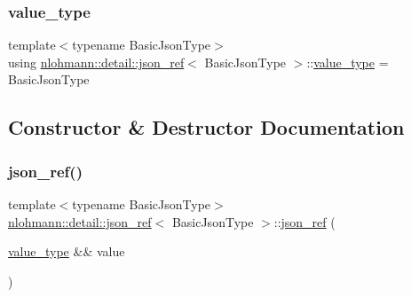 \subsubsection{\texorpdfstring{value\_type}{value\_type}}
{\footnotesize\ttfamily template$<$typename Basic\+Json\+Type$>$ \\
using \mbox{\hyperlink{classnlohmann_1_1detail_1_1json__ref}{nlohmann\+::detail\+::json\+\_\+ref}}$<$ Basic\+Json\+Type $>$\+::\mbox{\hyperlink{classnlohmann_1_1detail_1_1json__ref_a78d76cf288141049568c0d670ed670ef}{value\+\_\+type}} =  Basic\+Json\+Type}



\subsection{Constructor \& Destructor Documentation}
\mbox{\label{classnlohmann_1_1detail_1_1json__ref_ae1adf5bcee8b6fa0c358710604fb1938}} 
\subsubsection{\texorpdfstring{json\_ref()}{json\_ref()}\hspace{0.1cm}{\footnotesize\ttfamily [1/6]}}
{\footnotesize\ttfamily template$<$typename Basic\+Json\+Type$>$ \\
\mbox{\hyperlink{classnlohmann_1_1detail_1_1json__ref}{nlohmann\+::detail\+::json\+\_\+ref}}$<$ Basic\+Json\+Type $>$\+::\mbox{\hyperlink{classnlohmann_1_1detail_1_1json__ref}{json\+\_\+ref}} (\begin{DoxyParamCaption}\item[{\mbox{\hyperlink{classnlohmann_1_1detail_1_1json__ref_a78d76cf288141049568c0d670ed670ef}{value\+\_\+type}} \&\&}]{value }\end{DoxyParamCaption})\hspace{0.3cm}{\ttfamily [inline]}}

\mbox{\label{classnlohmann_1_1detail_1_1json__ref_a8c3eb3c6e952ed0cd7eece586ab4047c}} 
